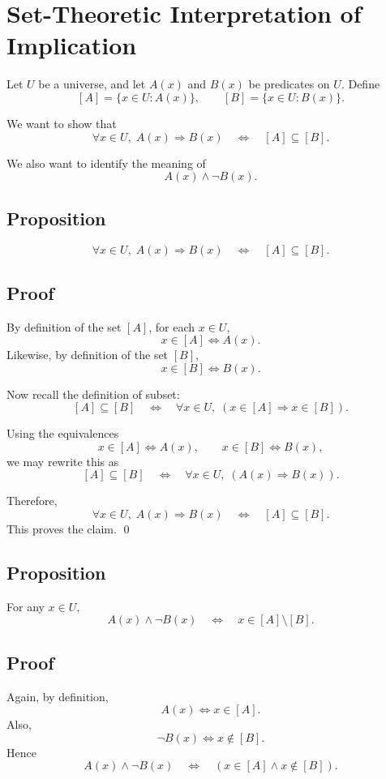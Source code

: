 \documentclass{article}
\begin{document}
	\section*{Set-Theoretic Interpretation of Implication}
	
	Let \(U\) be a universe, and let \(A(x)\) and \(B(x)\) be predicates on \(U\). Define
	\[
	[A]=\{x\in U : A(x)\},
	\qquad
	[B]=\{x\in U : B(x)\}.
	\]
	
	We want to show that
	\[
	\forall x\in U,\; A(x)\Rightarrow B(x)
	\quad\Longleftrightarrow\quad
	[A]\subseteq[B].
	\]
	
	We also want to identify the meaning of
	\[
	A(x)\land \neg B(x).
	\]
	
	\subsection*{Proposition}
	\[
	\forall x\in U,\; A(x)\Rightarrow B(x)
	\quad\Longleftrightarrow\quad
	[A]\subseteq[B].
	\]
	
	\subsection*{Proof}
	By definition of the set \([A]\), for each \(x\in U\),
	\[
	x\in[A] \iff A(x).
	\]
	Likewise, by definition of the set \([B]\),
	\[
	x\in[B] \iff B(x).
	\]
	
	Now recall the definition of subset:
	\[
	[A]\subseteq[B]
	\quad\Longleftrightarrow\quad
	\forall x\in U,\; (x\in[A]\Rightarrow x\in[B]).
	\]
	
	Using the equivalences
	\[
	x\in[A]\iff A(x),
	\qquad
	x\in[B]\iff B(x),
	\]
	we may rewrite this as
	\[
	[A]\subseteq[B]
	\quad\Longleftrightarrow\quad
	\forall x\in U,\; (A(x)\Rightarrow B(x)).
	\]
	
	Therefore,
	\[
	\forall x\in U,\; A(x)\Rightarrow B(x)
	\quad\Longleftrightarrow\quad
	[A]\subseteq[B].
	\]
	This proves the claim.
	\qed
	
	\subsection*{Proposition}
	For any \(x\in U\),
	\[
	A(x)\land \neg B(x)
	\quad\Longleftrightarrow\quad
	x\in[A]\setminus[B].
	\]
	
	\subsection*{Proof}
	Again, by definition,
	\[
	A(x)\iff x\in[A].
	\]
	Also,
	\[
	\neg B(x)\iff x\notin[B].
	\]
	Hence
	\[
	A(x)\land \neg B(x)
	\quad\Longleftrightarrow\quad
	(x\in[A]\land x\notin[B]).
	\]
	
\end{document}
